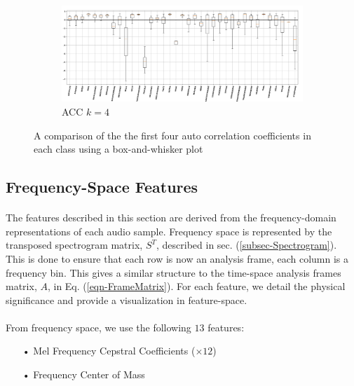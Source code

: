 \documentclass[12pt,letterpaper]{article}
\begin{document}
\begin{figure}[H]
\begin{center}
	\begin{subfigure}{1.0\textwidth}
	\centering
	\includegraphics[width=\textwidth , height=0.2\textheight]
		{../FiguresFeatures/ACC_4}
	\caption{ACC $k=4$}
	\end{subfigure}	
	
\end{center}
\caption{A comparison of the the first four auto correlation coefficients in each class using a box-and-whisker plot}
\label{fig-FeatureACC}
\end{figure}


\newpage

\subsection{Frequency-Space Features}
\label{subsec-FreqFeatures}

\paragraph*{}The features described in this section are derived from the frequency-domain representations of each audio sample. Frequency space is represented by the transposed spectrogram matrix, $S^T$, described in sec. (\ref{subsec-Spectrogram}). This is done to ensure that each  row is now an analysis frame, each column is a frequency bin. This gives a similar structure to the time-space analysis frames matrix, $A$, in Eq. (\ref{eqn-FrameMatrix}).
For each feature, we detail the physical significance and provide a visualization in feature-space.

\paragraph*{}From frequency space, we use the following $13$ features:
\begin{itemize}
\item[•] Mel Frequency Cepstral Coefficients ($\times 12$)
\item[•] Frequency Center of Mass
\end{itemize}
\end{document}
